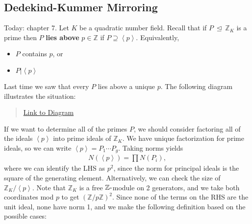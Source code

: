 \hypertarget{dedekind-kummer-mirroring}{%
\subsection{Dedekind-Kummer Mirroring}\label{dedekind-kummer-mirroring}}

\begin{remark}

Today: chapter 7. Let \(K\) be a quadratic number field. Recall that if
\(P {~\trianglelefteq~}{\mathbb{Z}}_K\) is a prime then \(P\)
\textbf{lies above} \(p\in {\mathbb{Z}}\) if
\(P \supseteq \left\langle{ p }\right\rangle\). Equivalently,

\begin{itemize}
\tightlist
\item
  \(P\) contains \(p\), or
\item
  \(P \mathrel{\Big|}\left\langle{ p }\right\rangle\)
\end{itemize}

Last time we saw that every \(P\) lies above a unique \(p\). The
following diagram illustrates the situation:

\begin{center}
\end{center}

\begin{quote}
\href{https://q.uiver.app/?q=WzAsNixbMCwwLCJLIl0sWzAsMiwiXFxRUSJdLFsyLDAsIlxcWlpfSyJdLFsyLDIsIlxcWloiXSxbNCwwLCJQIl0sWzQsMiwicCJdLFswLDEsIiIsMCx7InN0eWxlIjp7ImhlYWQiOnsibmFtZSI6Im5vbmUifX19XSxbMiwzLCIiLDAseyJzdHlsZSI6eyJoZWFkIjp7Im5hbWUiOiJub25lIn19fV0sWzQsNSwiIiwwLHsic3R5bGUiOnsiaGVhZCI6eyJuYW1lIjoibm9uZSJ9fX1dXQ==}{Link
to Diagram}
\end{quote}

If we want to determine all of the primes \(P\), we should consider
factoring all of the ideals \(\left\langle{ p }\right\rangle\) into
prime ideals of \({\mathbb{Z}}_K\). We have unique factorization for
prime ideals, so we can write
\(\left\langle{ p }\right\rangle = P_1 \cdots P_g\). Taking norms yields
\begin{align*}
N( \left\langle{ p }\right\rangle ) = \prod N(P_i) 
,\end{align*}
where we can identify the LHS as \(p^2\), since the norm for principal
ideals is the square of the generating element. Alternatively, we can
check the size of \({\mathbb{Z}}_K/ \left\langle{ p }\right\rangle\).
Note that \({\mathbb{Z}}_K\) is a free \({\mathbb{Z}}{\hbox{-}}\)module
on 2 generators, and we take both coordinates mod \(p\) to get
\(({\mathbb{Z}}/p{\mathbb{Z}})^2\). Since none of the terms on the RHS
are the unit ideal, none have norm 1, and we make the following
definition based on the possible cases:


\end{remark}
